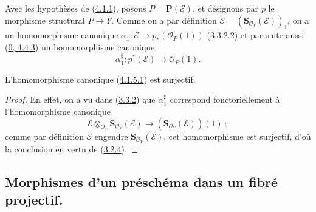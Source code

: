 \begin{env}[4.1.5]
\label{II.4.1.5-fr}
Avec les hypothèses de (\hyperref[II.4.1.1-fr]{4.1.1}), posons
$P=\mathbf{P}(\mathcal{E})$, et désignons par $p$ le morphisme structural
$P\to Y$. Comme on a par définition
$\mathcal{E}=(\mathbf{S}_{\mathcal{O}_Y}(\mathcal{E}))_1$, on a un
homomorphisme canonique
$\alpha_1:\mathcal{E}\to p_*(\mathcal{O}_P(1))$
(\hyperref[II.3.3.2.2-fr]{3.3.2.2}) et par suite aussi
(\hyperref[0.4.4.3-fr]{0, 4.4.3}) un homomorphisme canonique
\[
\label{II.4.1.5.1-fr}
  \alpha_1^\sharp:p^*(\mathcal{E})\longrightarrow\mathcal{O}_P(1).
\tag{4.1.5.1}
\]
\end{env}

\begin{proposition}[4.1.6]
\label{II.4.1.6-fr}
L'homomorphisme canonique (\hyperref[II.4.1.5.1-fr]{4.1.5.1}) est surjectif.
\end{proposition}

\begin{proof}
En effet, on a vu dans (\hyperref[II.3.3.2-fr]{3.3.2}) que
$\alpha_1^\sharp$ correspond fonctoriellement à l'homomorphisme canonique
\[
  \mathcal{E}\otimes_{\mathcal{O}_Y}
  \mathbf{S}_{\mathcal{O}_Y}(\mathcal{E})
  \longrightarrow
  (\mathbf{S}_{\mathcal{O}_Y}(\mathcal{E}))(1)~;
\]
comme par définition $\mathcal{E}$ engendre
$\mathbf{S}_{\mathcal{O}_Y}(\mathcal{E})$, cet homomorphisme est surjectif,
d'où la conclusion en vertu de (\hyperref[II.3.2.4-fr]{3.2.4}).
\end{proof}

\subsection{Morphismes d'un préschéma dans un fibré projectif.}
\label{subsection:II.4.2-fr}

